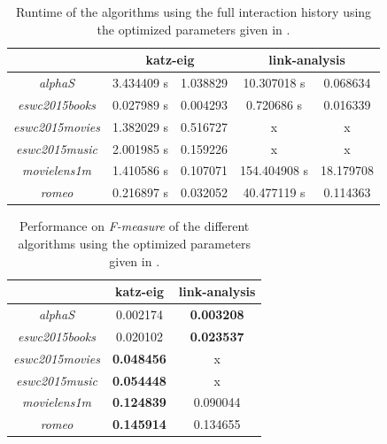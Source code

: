 \begin{table}[h!]
    \centering
    \begin{tabular}{| c | c | c | c | c |}
        \hline
        \textbf{}               & \multicolumn{2}{c|}{\textbf{katz-eig}} & \multicolumn{2}{c|}{\textbf{link-analysis}} \\ \hline
        \textit{alphaS}         & 3.434409 s & 1.038829 & 10.307018 s  & 0.068634       \\ \hline
        \textit{eswc2015books}  & 0.027989 s & 0.004293 & 0.720686 s   & 0.016339       \\ \hline
        \textit{eswc2015movies} & 1.382029 s & 0.516727 & x            & x              \\ \hline
        \textit{eswc2015music}  & 2.001985 s & 0.159226 & x            & x              \\ \hline
        \textit{movielens1m}    & 1.410586 s & 0.107071 & 154.404908 s & 18.179708      \\ \hline
        \textit{romeo}          & 0.216897 s & 0.032052 & 40.477119 s  & 0.114363       \\ \hline
    \end{tabular}
    \caption{Runtime of the algorithms using the full interaction history using the optimized parameters given in .}
    \label{tab:alg_full_time}
\end{table}


\begin{table}[h!]
    \centering
    \begin{tabular}{| c | c | c | }
        \hline
        \textbf{}               & \textbf{katz-eig} & \textbf{link-analysis} \\ \hline
        \textit{alphaS}         & 0.002174          & \textbf{0.003208}      \\ \hline
        \textit{eswc2015books}  & 0.020102          & \textbf{0.023537}      \\ \hline
        \textit{eswc2015movies} & \textbf{0.048456} & x                      \\ \hline
        \textit{eswc2015music}  & \textbf{0.054448} & x                      \\ \hline
        \textit{movielens1m}    & \textbf{0.124839} & 0.090044               \\ \hline
        \textit{romeo}          & \textbf{0.145914} & 0.134655               \\ \hline
    \end{tabular}
    \caption{Performance on \textit{F-measure} of the different algorithms using the optimized parameters given in .}
    \label{tab:alg_full_perf}
\end{table}

